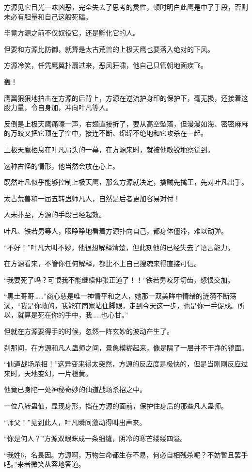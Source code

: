 \begin{this_body}
方源见它目光一味凶恶，完全失去了思考的灵性，顿时明白此鹰是中了手段，否则未必有胆量和自己这般死磕。

毕竟方源之前不仅奴役它，还是孵化它的人。

但要和方源比防御，就算是太古荒兽的上极天鹰也要落入绝对的下风。

方源冷笑，任凭鹰翼扑扇过来，恶风狂啸，他自己只管朝地面疾飞。

轰！

鹰翼狠狠地拍击在方源的后背上，方源在逆流护身印的保护下，毫无损，还接着这股力量，令自身加，冲向叶凡等人。

反倒是上极天鹰痛嚎一声，右翅直接折了，要从高空坠落，但漫漫如海、密密麻麻的万蛟又把它顶在了空中，接连不断、绵绵不绝地和它攻杀在一起。

上极天鹰栖息在叶凡肩头的一幕，在方源来时，就被他敏锐地察觉到。

这种古怪的情形，他当然会放在心上。

既然叶凡似乎能够控制上极天鹰，那么方源就决定，擒贼先擒王，先对叶凡出手。

太古荒兽和一届五转蛊师凡人，自然是后者更加容易对付！

人未扑至，方源的手段已经起效。

叶凡、铁若男等人，眼睁睁地看着方源扑向自己，都身体僵滞，难以动弹。

“不好！”叶凡大叫不妙，他很想解释清楚，但此刻他的已经失去了语言能力。

在方源看来，不管你任何解释，都比不上自己搜魂来得直接可信。

“我要死了吗？可恨我不能继续伸张正道了！！”铁若男咬牙切齿，怒恨交加。

“黑土哥哥……”商心慈是唯一神情平和之人，她那一双美眸中情绪的涟漪不断荡漾，“我是你救的，我能在商家站住脚跟，走到今天这一步，也是你一手促成。所以，就算是死在你的手中，我……也心甘。”

但就在方源要得手的时候，忽然一阵玄妙的波动产生了。

刹那间，在方源和凡人蛊师之间，景象模糊起来，像是隔了一层并不干净的镜面。

“仙道战场杀招！”这异变来得太突然，方源的反应度是极快的，但是当刚刚反应过来时，天地变幻，一片橙黄。

他竟已身陷一处神秘奇妙的仙道战场杀招之中。

一位八转蛊仙，显现身形，挡在方源的面前，保护住身后的那些凡人蛊师。

“师父！”见到此人，叶凡瞬间激动得叫出声来。

“你是何人？”方源双眼眯成一条细缝，阴冷的寒芒缕缕四溢。

“我姓6，名畏因。方源啊，万物生命都生存不易，何必自相残杀呢？不妨暂且罢手吧。”来者微笑从容地答道。

\end{this_body}

